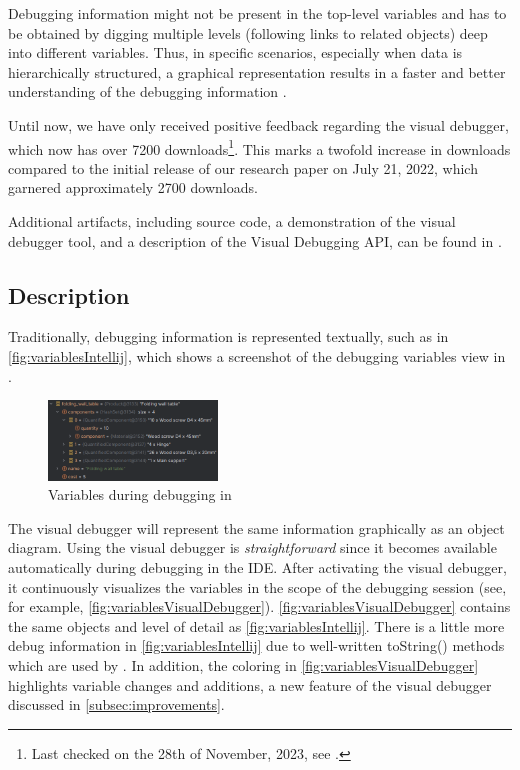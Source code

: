 \documentclass[sigconf]{acmart}
\begin{document}
Debugging information might not be present in the top-level variables and has to be obtained by digging multiple levels (following links to related objects) deep into different variables.
Thus, in specific scenarios, especially when data is hierarchically structured, a graphical representation results in a faster and better understanding of the debugging information \cite{krauterVisualDebuggerTool2022}.

Until now, we have only received positive feedback regarding the visual debugger, which now has over 7200 downloads\footnote{Last checked on the 28th of November, 2023, see \cite{timkrauterVisualDebuggerIntelliJ2023}.}.
This marks a twofold increase in downloads compared to the initial release of our research paper \cite{krauterVisualDebuggerTool2022} on July 21, 2022, which garnered approximately 2700 downloads.

Additional artifacts, including source code, a demonstration of the visual debugger tool, and a description of the Visual Debugging API, can be found in \cite{timkrauterICSE2024Artifacts2023}.

\subsection{Description}

Traditionally, debugging information is represented textually, such as in \autoref{fig:variablesIntellij}, which shows a screenshot of the debugging variables view in \intellij.

\begin{figure}[h]
    \centering
    \includegraphics[width=0.4\textwidth]{images/variables.png}
    \caption{Variables during debugging in \intellij}
    \label{fig:variablesIntellij}
\end{figure}

The visual debugger will represent the same information graphically as an object diagram.
Using the visual debugger is \textit{straightforward} since it becomes available automatically during debugging in the IDE.
After activating the visual debugger, it continuously visualizes the variables in the scope of the debugging session (see, for example, \autoref{fig:variablesVisualDebugger}).
\autoref{fig:variablesVisualDebugger} contains the same objects and level of detail as \autoref{fig:variablesIntellij}.
There is a little more debug information in \autoref{fig:variablesIntellij} due to well-written \textsf{toString()} methods which are used by \intellij{}.
In addition, the coloring in \autoref{fig:variablesVisualDebugger} highlights variable changes and additions, a new feature of the visual debugger discussed in \autoref{subsec:improvements}.
\end{document}
